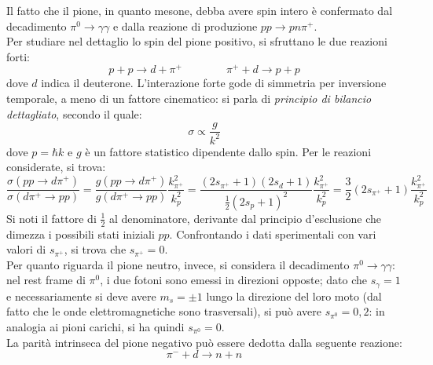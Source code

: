 Il fatto che il pione, in quanto mesone, debba avere spin intero è confermato dal decadimento $ \pi^0 \rightarrow \gamma \gamma $ e dalla reazione di produzione $ p p \rightarrow p n \pi^+ $.\\
Per studiare nel dettaglio lo spin del pione positivo, si sfruttano le due reazioni forti:
\begin{equation*}
	p + p \rightarrow d + \pi^+
	\qquad \qquad
	\pi^+ + d \rightarrow p + p
\end{equation*}
dove $ d $ indica il deuterone. L'interazione forte gode di simmetria per inversione temporale, a meno di un fattore cinematico: si parla di \textit{principio di bilancio dettagliato}, secondo il quale:
\begin{equation}
	\sigma \propto \frac{g}{k^2}
	\label{eq:9.4}
\end{equation}
dove $ p = \hbar k $ e $ g $ è un fattore statistico dipendente dallo spin. Per le reazioni considerate, si trova:
\begin{equation*}
	\frac{\sigma(pp \rightarrow d\pi^+)}{\sigma(d\pi^+ \rightarrow pp)} = \frac{g(pp \rightarrow d\pi^+)}{g(d\pi^+ \rightarrow pp)} \frac{k_{\pi^+}^2}{k_p^2} = \frac{(2s_{\pi^+} + 1)(2s_d + 1)}{\frac{1}{2} (2s_p + 1)^2} \frac{k_{\pi^+}^2}{k_p^2} = \frac{3}{2} \left( 2s_{\pi^+} + 1 \right) \frac{k_{\pi^+}^2}{k_p^2}
\end{equation*}
Si noti il fattore di $ \frac{1}{2} $ al denominatore, derivante dal principio d'esclusione che dimezza i possibili stati iniziali $ pp $. Confrontando i dati sperimentali con vari valori di $ s_{\pi^+} $, si trova che $ s_{\pi^+} = 0 $.\\
Per quanto riguarda il pione neutro, invece, si considera il decadimento $ \pi^0 \rightarrow \gamma \gamma $: nel rest frame di $ \pi^0 $, i due fotoni sono emessi in direzioni opposte; dato che $ s_{\gamma} = 1 $ e necessariamente si deve avere $ m_s = \pm 1 $ lungo la direzione del loro moto (dal fatto che le onde elettromagnetiche sono trasversali), si può avere $ s_{\pi^0} = 0,2 $: in analogia ai pioni carichi, si ha quindi $ s_{\pi^0} = 0 $.\\
La parità intrinseca del pione negativo può essere dedotta dalla seguente reazione:
\begin{equation*}
	\pi^- + d \rightarrow n + n
\end{equation*}
